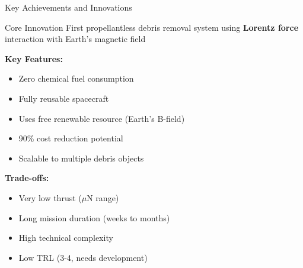 \documentclass[aspectratio=169]{beamer}
\begin{document}
\begin{frame}{Key Achievements and Innovations}
\begin{block}{Core Innovation}
First propellantless debris removal system using \textbf{Lorentz force} interaction with Earth's magnetic field
\end{block}

\textbf{Key Features:}
\begin{itemize}
    \item \textcolor{green}{\checkmark} Zero chemical fuel consumption
    \item \textcolor{green}{\checkmark} Fully reusable spacecraft
    \item \textcolor{green}{\checkmark} Uses free renewable resource (Earth's B-field)
    \item \textcolor{green}{\checkmark} 90\% cost reduction potential
    \item \textcolor{green}{\checkmark} Scalable to multiple debris objects
\end{itemize}

\textbf{Trade-offs:}
\begin{itemize}
    \item \textcolor{red}{} Very low thrust ($\mu$N range)
    \item \textcolor{red}{} Long mission duration (weeks to months)
    \item \textcolor{red}{} High technical complexity
    \item \textcolor{red}{} Low TRL (3-4, needs development)
\end{itemize}
\end{frame}
\end{document}

